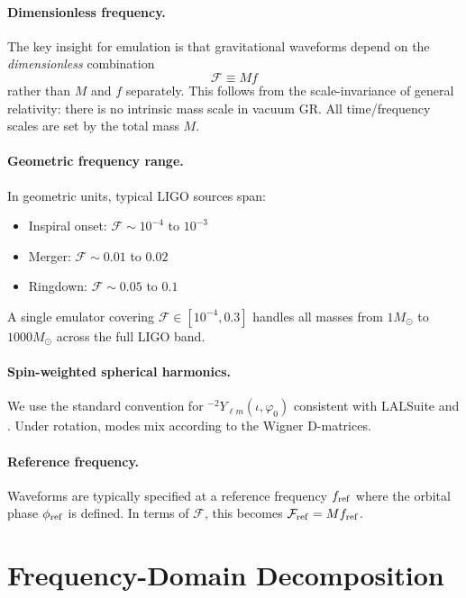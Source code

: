 \documentclass[11pt,a4paper]{article}
\newcommand{\Ylm}{{}^{-2}Y_{\ell m}}
\newcommand{\Mf}{\mathcal{F}}
\begin{document}
\paragraph{Dimensionless frequency.} The key insight for emulation is that gravitational waveforms depend on the \emph{dimensionless} combination
\begin{equation}
    \boxed{\Mf \equiv M f}
    \label{eq:Mf_def}
\end{equation}
rather than $M$ and $f$ separately. This follows from the scale-invariance of general relativity: there is no intrinsic mass scale in vacuum GR. All time/frequency scales are set by the total mass $M$.

\paragraph{Geometric frequency range.} In geometric units, typical LIGO sources span:
\begin{itemize}
    \item Inspiral onset: $\Mf \sim 10^{-4}$ to $10^{-3}$
    \item Merger: $\Mf \sim 0.01$ to $0.02$
    \item Ringdown: $\Mf \sim 0.05$ to $0.1$
\end{itemize}
A single emulator covering $\Mf \in [10^{-4}, 0.3]$ handles all masses from $1 M_\odot$ to $1000 M_\odot$ across the full LIGO band.

\paragraph{Spin-weighted spherical harmonics.} We use the standard convention for $\Ylm(\iota, \varphi_0)$ consistent with LALSuite and \cite{boyle2011}. Under rotation, modes mix according to the Wigner D-matrices.

\paragraph{Reference frequency.} Waveforms are typically specified at a reference frequency $f_{\rm ref}$ where the orbital phase $\phi_{\rm ref}$ is defined. In terms of $\Mf$, this becomes $\Mf_{\rm ref} = M f_{\rm ref}$.

\section{Frequency-Domain Decomposition}
\end{document}
